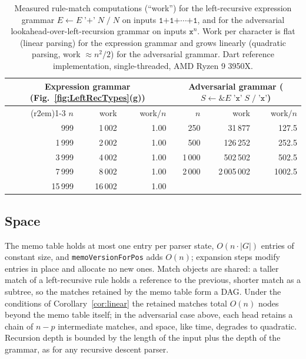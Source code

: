 \documentclass[manuscript]{acmart}
\newcommand{\cd}[1]{\texttt{#1}}
\begin{document}
\begin{table}[tbp]
\centering
{\small
\begin{tabular}{rrr@{\hspace{2.5em}}rrr}\toprule
\multicolumn{3}{c}{Expression grammar (Fig.~\ref{fig:LeftRecTypes}(g))} & \multicolumn{3}{c}{Adversarial grammar ($S \leftarrow \texttt{\&}E \; \texttt{'x'} \; S \; / \; \texttt{'x'}$)} \\
\cmidrule(r{2em}){1-3}\cmidrule{4-6}
$n$ & work & work$/n$ & $n$ & work & work$/n$ \\\midrule
  999 &  1\,002 & 1.00 &  250 &    31\,877 &  127.5 \\
 1\,999 &  2\,002 & 1.00 &  500 &   126\,252 &  252.5 \\
 3\,999 &  4\,002 & 1.00 & 1\,000 &   502\,502 &  502.5 \\
 7\,999 &  8\,002 & 1.00 & 2\,000 & 2\,005\,002 & 1002.5 \\
15\,999 & 16\,002 & 1.00 &      &            &       \\\bottomrule
\end{tabular}
}
\caption{\label{tab:adversarial}Measured rule-match computations (``work'') for the left-recursive expression grammar $E \leftarrow E \; \texttt{'+'} \; N \; / \; N$ on inputs $\texttt{1+1+}\cdots\texttt{+1}$, and for the adversarial lookahead-over-left-recursion grammar on inputs $\texttt{x}^n$. Work per character is flat (linear parsing) for the expression grammar and grows linearly (quadratic parsing, work $\approx n^2/2$) for the adversarial grammar. Dart reference implementation, single-threaded, AMD Ryzen 9 3950X.}
\end{table}

\subsection{Space}
\label{sec:space}

The memo table holds at most one entry per parser state, $O(n \cdot |G|)$ entries of constant size, and \cd{memoVersionForPos} adds $O(n)$; expansion steps modify entries in place and allocate no new ones. Match objects are shared: a taller match of a left-recursive rule holds a reference to the previous, shorter match as a subtree, so the matches retained by the memo table form a DAG. Under the conditions of Corollary~\ref{cor:linear} the retained matches total $O(n)$ nodes beyond the memo table itself; in the adversarial case above, each head retains a chain of $n - p$ intermediate matches, and space, like time, degrades to quadratic. Recursion depth is bounded by the length of the input plus the depth of the grammar, as for any recursive descent parser.
\end{document}
